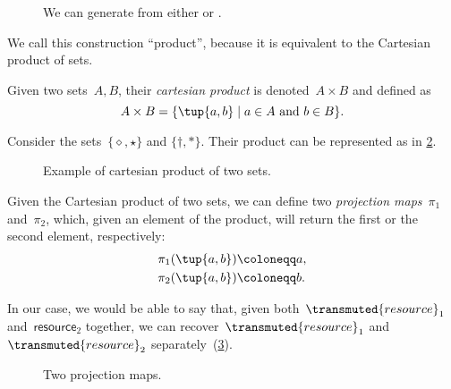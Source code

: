 \begin{figure}[h!]
    \centering
    \caption{We can generate  from either  or  . \label{fig:e16b}}
\end{figure}


We call this construction ``product'', because it is equivalent to the Cartesian product of sets.



\begin{definition}
\label{def:cartesian-product}
   Given two sets~$A,B$, their \emph{cartesian product} is denoted~$A\times  B$
   and defined as 
   \begin{equation}
       A\times  B=\{ \tup{a,b}\mid a\in A\text{ and } b\in B\}.
   \end{equation}
\end{definition}

\begin{example}
Consider the sets~$\{\diamond,\star\}$ and $\{\dagger, \ast\}$. Their product can be represented as in \cref{fig:cartesian-product}.
\begin{figure}[h!]
    \centering
    \caption{Example of cartesian product of two sets.\label{fig:cartesian-product}}
\end{figure}
\end{example}

Given the Cartesian product of two sets, we can define two \emph{projection maps}~$\pi_1$ and~$\pi_2$, which, given an element of the product, will return the first or the second element, respectively:
\begin{equation}
\begin{aligned}
    \pi_1(\tup{a,b}) &\coloneqq a,\\
    \pi_2(\tup{a,b}) &\coloneqq b.
\end{aligned}
\end{equation}

In our case, we would be able to say that, given both~$\transmuted{resource}_1$ and~$\textsf{resource}_2$ together, we can recover~$\transmuted{resource}_1$ and~$\transmuted{resource}_2$ separately~(\cref{fig:resource-product}).

\begin{figure}[h!]
    \centering
    \caption{Two projection maps. \label{fig:resource-product}}
\end{figure}


